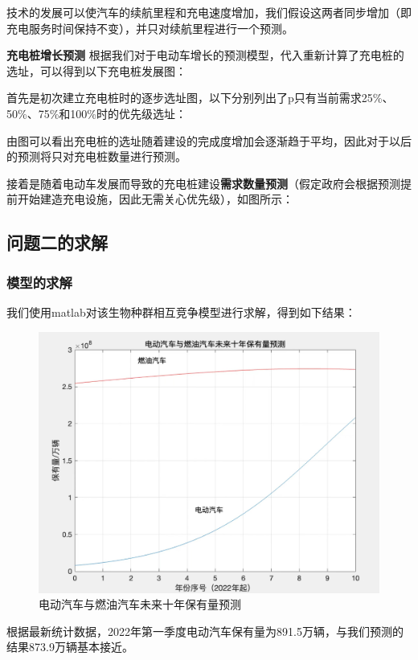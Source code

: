 \documentclass[12pt, a4paper, oneside]{ctexart}
\begin{document}
技术的发展可以使汽车的续航里程和充电速度增加，我们假设这两者同步增加（即充电服务时间保持不变），并只对续航里程进行一个预测。

\textbf{充电桩增长预测}
根据我们对于电动车增长的预测模型，代入重新计算了充电桩的选址，可以得到以下充电桩发展图：

首先是初次建立充电桩时的逐步选址图，以下分别列出了p只有当前需求25\%、50\%、75\%和100\%时的优先级选址：


由图可以看出充电桩的选址随着建设的完成度增加会逐渐趋于平均，因此对于以后的预测将只对充电桩数量进行预测。

接着是随着电动车发展而导致的充电桩建设\textbf{需求数量预测}（假定政府会根据预测提前开始建造充电设施，因此无需关心优先级），如图所示：


\subsection{问题二的求解}
\subsubsection{模型的求解}

我们使用matlab对该生物种群相互竞争模型进行求解，得到如下结果：

\begin{figure}[H]
  \centering
  \includegraphics[width=\textwidth]{pic/911652953505_.pic.jpg}
  \caption{电动汽车与燃油汽车未来十年保有量预测}
  \label{fig:电动汽车与燃油汽车未来十年保有量预测}
\end{figure}

根据最新统计数据，2022年第一季度电动汽车保有量为891.5万辆，与我们预测的结果873.9万辆基本接近。
\end{document}

